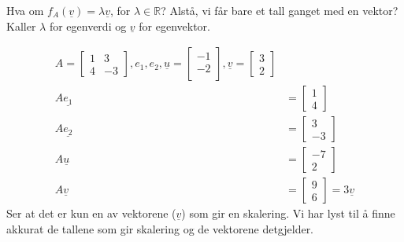 \documentclass[11pt, a4paper, norsk]{article}
\begin{document}
        Hva om $f_{A}(\underline{v}) = \lambda\underline{v}$, for $\lambda \in \mathbb{R}$? Alstå, vi får bare et tall ganget med en vektor? Kaller $\lambda$ for egenverdi og $\underline{v}$ for egenvektor. 
        \begin{Example}{}{}
                        \begin{align*}
                A = \begin{bmatrix}
                    1 & 3 \\
                    4 & -3
                \end{bmatrix}, e_{1}, e_{2}, \underline{u} = \begin{bmatrix}
                    -1 \\
                    -2 \\
                \end{bmatrix}, \underline{v} = \begin{bmatrix}
                    3 \\
                    2
                \end{bmatrix}
                \\
                A\underline{e_1} &= \begin{bmatrix}
                    1 \\
                    4
                \end{bmatrix}
                \\
                A\underline{e_2} &= \begin{bmatrix}
                    3 \\
                    -3
                \end{bmatrix}
                \\
                A\underline{u} &= \begin{bmatrix}
                    -7 \\
                    2
                \end{bmatrix}
                \\
                A\underline{v} &= \begin{bmatrix}
                    9 \\
                    6
                \end{bmatrix} = 3\underline{v}
            \end{align*}
            Ser at det er kun en av vektorene ($\underline{v}$) som gir en skalering. Vi har lyst til å finne akkurat de tallene som gir skalering og de vektorene detgjelder.
        \end{Example}
\end{document}
